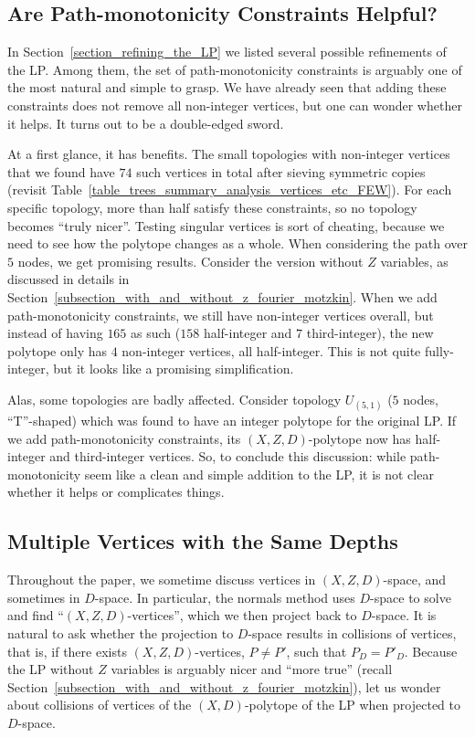 \subsection{Are Path-monotonicity Constraints Helpful?}
In Section~\ref{section_refining_the_LP} we listed several possible refinements of the LP. Among them, the set of path-monotonicity constraints is arguably one of the most natural and simple to grasp. We have already seen that adding these constraints does not remove all non-integer vertices, but one can wonder whether it helps. It turns out to be a double-edged sword.

At a first glance, it has benefits. The small topologies with non-integer vertices that we found have $74$ such vertices in total after sieving symmetric copies (revisit Table~\ref{table_trees_summary_analysis_vertices_etc_FEW}). For each specific topology, more than half satisfy these constraints, so no topology becomes ``truly nicer''. Testing singular vertices is sort of cheating, because we need to see how the polytope changes as a whole. When considering the path over $5$ nodes, we get promising results. Consider the version without $Z$ variables, as discussed in details in Section~\ref{subsection_with_and_without_z_fourier_motzkin}. When we add path-monotonicity constraints, we still have non-integer vertices overall, but instead of having $165$ as such ($158$ half-integer and $7$ third-integer), the new polytope only has $4$ non-integer vertices, all half-integer. This is not quite fully-integer, but it looks like a promising simplification.

Alas, some topologies are badly affected. Consider topology $U_{(5,1)}$ ($5$ nodes, ``T''-shaped) which was found to have an integer polytope for the original LP. If we add path-monotonicity constraints, its $(X,Z,D)$-polytope now has half-integer and third-integer vertices. So, to conclude this discussion: while path-monotonicity seem like a clean and simple addition to the LP, it is not clear whether it helps or complicates things.


\subsection{Multiple Vertices with the Same Depths}
Throughout the paper, we sometime discuss vertices in $(X,Z,D)$-space, and sometimes in $D$-space. In particular, the normals method uses $D$-space to solve and find ``$(X,Z,D)$-vertices'', which we then project back to $D$-space. It is natural to ask whether the projection to $D$-space results in collisions of vertices, that is, if there exists $(X,Z,D)$-vertices, $P \ne P'$, such that $P_D = P'_D$. Because the LP without $Z$ variables is arguably nicer and ``more true'' (recall Section~\ref{subsection_with_and_without_z_fourier_motzkin}), let us wonder about collisions of vertices of the $(X,D)$-polytope of the LP when projected to $D$-space.

